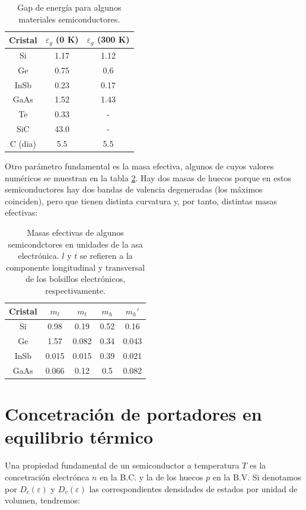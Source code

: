 \begin{table}[h!] \centering
\begin{tabular}{ccc}
	Cristal & $\varepsilon_g$ (0 K) & $\varepsilon_g$ (300 K) \\ \hline
	Si & 1.17 & 1.12 \\
	Ge & 0.75 & 0.6 \\
	InSb & 0.23 & 0.17 \\ 
	GaAs & 1.52 & 1.43 \\
	Te & 0.33 & - \\ 
	SiC & 43.0 & - \\
	C (dia) & 5.5 & 5.5
\end{tabular}
\caption{Gap de energía para algunos materiales semiconductores.}
\label{Tab:09-01}
\end{table}
Otro parámetro fundamental es la masa efectiva, algunos de cuyos valores numéricos se muestran en la tabla \ref{Tab:09-02}. Hay dos masas de huecos porque en estos semiconductores hay dos bandas de valencia degeneradas (los máximos coinciden), pero que tienen distinta curvatura y, por tanto, distintas masas efectivas:

\begin{table}[h!] \centering
	\begin{tabular}{ccccc}
		Cristal & $m_l$ & $m_t$ & $m_h$ & $m_h'$ \\ \hline
		Si & 0.98 & 0.19 & 0.52 & 0.16 \\
		Ge & 1.57 & 0.082 & 0.34 & 0.043 \\
		InSb & 0.015 & 0.015 & 0.39 & 0.021 \\
		GaAs & 0.066 & 0.12 & 0.5 & 0.082
	\end{tabular}
	\caption{Masas efectivas de algunos semicondctores en unidades de la asa electrónica. $l$ y $t$ se refieren a la componente longitudinal y transversal de los bolsillos electrónicos, respectivamente.}
	\label{Tab:09-02}
\end{table}

\section{Concetración de portadores en equilibrio térmico}

Una propiedad fundamental de un semiconductor a temperatura $T$ es la concetración electrónca $n$ en la B.C. y la de los huecos $p$ en la B.V. Si denotamos por $D_c(\varepsilon)$ y $D_v(\varepsilon)$ las correspondientes densidades de estados por unidad de volumen, tendremos:

